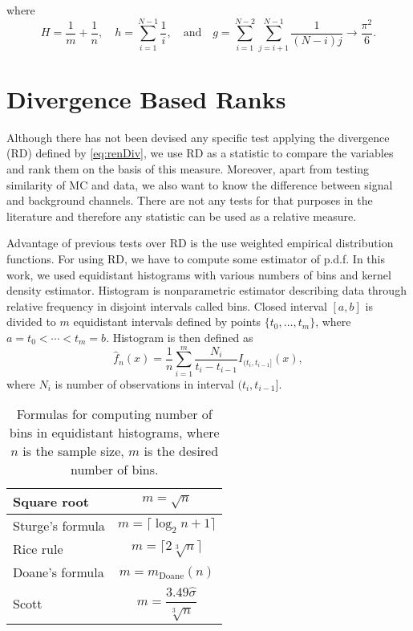 where
\begin{equation}
H = \frac{1}{m}+\frac{1}{n},\quad	h = \sum_{i=1}^{N-1}\frac{1}{i},\quad \mathrm{ and } \quad g = \sum_{i=1}^{N-2}\sum_{j=i+1}^{N-1}\frac{1}{(N-i)j}\rightarrow \frac{\pi^2}{6}.
\end{equation}

\section{\ren Divergence Based Ranks}
Although there has not been devised any specific test applying the \ren divergence (RD) defined by \eqref{eq:renDiv}, we use RD as a statistic to compare the variables and rank them on the basis of this measure. %
Moreover, apart from testing similarity of MC and data, we also want to know the difference between signal and background channels. There are not any tests for that purposes in the literature and therefore any statistic can be used as a relative measure. 

Advantage of previous tests over RD is the use weighted empirical distribution functions. For using RD, we have to compute some estimator of p.d.f. In this work, we used equidistant histograms with various numbers of bins and kernel density estimator. Histogram is nonparametric estimator describing data through relative frequency in disjoint intervals called bins. Closed interval $[a,b]$ is divided to $m$ equidistant intervals defined by points $\lbrace t_0, \ldots, t_m \rbrace$, where $a = t_0 < \cdots < t_m = b.$ Histogram is then defined as 
\begin{equation}
\hat{f}_n(x) = \frac{1}{n} \sum_{i=1}^m \frac{N_i}{t_i - t_{i-1}} I_{(t_i, t_{i-1}]}(x),
\end{equation}
where $N_i$ is number of observations in interval $(t_i, t_{i-1}]$.

\begin{table}[ht]
\centering
\begin{tabular}{|l | c|}
\hline 
\rule{0pt}{2.4ex} Square root & {$ m = \sqrt{n}$} \\%
\hline 
\rule{0pt}{2.4ex} Sturge's formula \cite{Sturges1926} &$ m = \lceil\log_2 n + 1\rceil$ \\ %
\hline
\rule{0pt}{2.4ex} Rice rule \cite{RiceRule}&  $m = \lceil 2 \sqrt[3]{n}\rceil$ \\ %
\hline
\rule{0pt}{2.4ex} Doane's formula \cite{Doane1976} &  $m =  m_{\mathrm{Doane}}(n)$ \\
\hline
\rule{0pt}{4ex} Scott \cite{Scott1979} &  $m = \dfrac{3.49 \hat{\sigma}}{\sqrt[3]{n}}$ \\
\hline
\end{tabular} 
\caption{Formulas for computing number of bins in equidistant histograms, where $n$ is the sample size, $m$ is the desired number of bins.}
\label{tab:histNbin}
\end{table}

